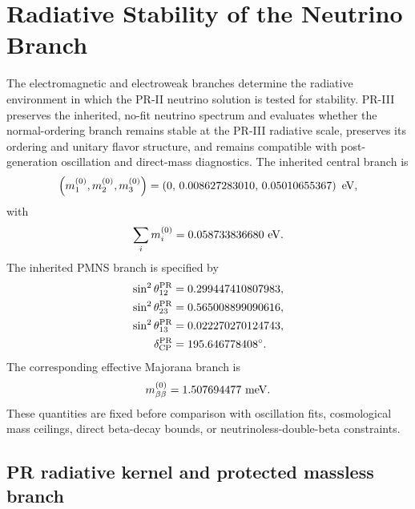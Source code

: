 \documentclass[11pt]{article}
\begin{document}
\section{Radiative Stability of the Neutrino Branch}
\label{sec:priii-neutrino-stability}

The electromagnetic and electroweak branches determine the radiative environment in which the PR-II neutrino solution is tested for stability.  PR-III preserves the inherited, no-fit neutrino spectrum and evaluates whether the normal-ordering branch remains stable at the PR-III radiative scale, preserves its ordering and unitary flavor structure, and remains compatible with post-generation oscillation and direct-mass diagnostics. The inherited central branch is
\begin{equation}
\left(m_1^{(0)},m_2^{(0)},m_3^{(0)}\right)
=
\left(
0,\,
0.008627283010,\,
0.05010655367
\right)\ {\rm eV},
\label{eq:priii-neutrino-central-spectrum}
\end{equation}
with
\begin{equation}
\sum_i m_i^{(0)}
=
0.058733836680\ {\rm eV}.
\label{eq:priii-neutrino-central-sum}
\end{equation}
The inherited PMNS branch is specified by
\begin{align}
\sin^2\theta_{12}^{\rm PR}&=0.299447410807983,\\
\sin^2\theta_{23}^{\rm PR}&=0.565008899090616,\\
\sin^2\theta_{13}^{\rm PR}&=0.022270270124743,\\
\delta_{\rm CP}^{\rm PR}&=195.646778408^\circ .
\end{align}
The corresponding effective Majorana branch is
\begin{equation}
m_{\beta\beta}^{(0)}
=
1.507694477\ {\rm meV}.
\label{eq:priii-mbb-central}
\end{equation}
These quantities are fixed before comparison with oscillation fits, cosmological mass ceilings, direct beta-decay bounds, or neutrinoless-double-beta constraints.

\subsection{PR radiative kernel and protected massless branch}
\label{subsec:priii-neutrino-radiative-kernel}
\end{document}
